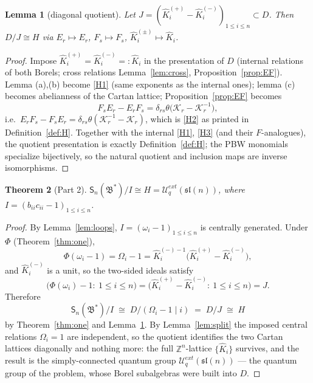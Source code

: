 \documentclass[11pt]{article}
\newtheorem{theorem}{Theorem}[section]
\newtheorem{lemma}[theorem]{Lemma}
\theoremstyle{definition}
\theoremstyle{remark}
\newcommand{\Z}{\mathbb{Z}}
\newcommand{\Uq}{\mathcal{U}_q}
\newcommand{\B}{\mathfrak{B}}
\newcommand{\Sn}{\mathsf{S}_n}
\newcommand{\del}{\delta}
\newcommand{\hK}{\hat K}
\newcommand{\cK}{\mathcal K}
\newcommand{\tht}{\theta}
\begin{document}
\begin{lemma}[diagonal quotient]\label{lem:diag}
Let $J=(\hK_i^{(+)}-\hK_i^{(-)})_{1\le i\le n}\subset D$.  Then
$D/J\cong H$ via $E_r\mapsto E_r$, $F_s\mapsto F_s$,
$\hK_i^{(\pm)}\mapsto\hK_i$.
\end{lemma}
\begin{proof}
Impose $\hK_i^{(+)}=\hK_i^{(-)}=:\hK_i$ in the presentation of $D$
(internal relations of both Borels; cross relations
Lemma~\ref{lem:cross}, Proposition~\ref{prop:EF}).  Lemma (a),(b)
become \eqref{H1} (same exponents as the internal ones); lemma (c)
becomes abelianness of the Cartan lattice; Proposition~\ref{prop:EF}
becomes
\[
F_sE_r-E_rF_s=\del_{rs}\tht\bigl(\cK_r-\cK_r^{-1}\bigr),
\]
i.e.\ $E_rF_s-F_sE_r=\del_{rs}\tht(\cK_r^{-1}-\cK_r)$, which is
\eqref{H2} as printed in Definition~\ref{def:H}.  Together with the
internal \eqref{H1}, \eqref{H3} (and their $F$-analogues), the
quotient presentation is exactly Definition~\ref{def:H}; the PBW
monomials specialize bijectively, so the natural quotient and
inclusion maps are inverse isomorphisms.
\end{proof}

\begin{theorem}[Part 2]\label{thm:two}
$\Sn(\B^*)/I\cong H=\Uq^{ext}(\mathfrak{sl}(n))$, where
$I=(b_{ii}c_{ii}-1)_{1\le i\le n}$.
\end{theorem}
\begin{proof}
By Lemma~\ref{lem:loops}, $I=(\omega_i-1)_{1\le i\le n}$ is centrally
generated.  Under $\Phi$ (Theorem~\ref{thm:one}),
\[
\Phi(\omega_i-1)=\Omega_i-1
=\hK_i^{(-)-1}\bigl(\hK_i^{(+)}-\hK_i^{(-)}\bigr),
\]
and $\hK_i^{(-)}$ is a unit, so the two-sided ideals satisfy
\[
\bigl(\Phi(\omega_i)-1:\ 1\le i\le n\bigr)
=\bigl(\hK_i^{(+)}-\hK_i^{(-)}:\ 1\le i\le n\bigr)=J .
\]
Therefore
\[
\Sn(\B^*)/I\;\cong\;D/(\Omega_i-1\mid i)\;=\;D/J\;\cong\;H
\]
by Theorem~\ref{thm:one} and Lemma~\ref{lem:diag}.  By
Lemma~\ref{lem:split} the imposed central relations
$\Omega_i=1$ are independent, so the quotient identifies the two
Cartan lattices diagonally and nothing more: the full
$\Z^n$-lattice $\{\hK_i\}$ survives, and the result is the
simply-connected quantum group
$\Uq^{ext}(\mathfrak{sl}(n))$ — the quantum group of the problem,
whose Borel subalgebras were built into $D$.
\end{proof}
\end{document}
